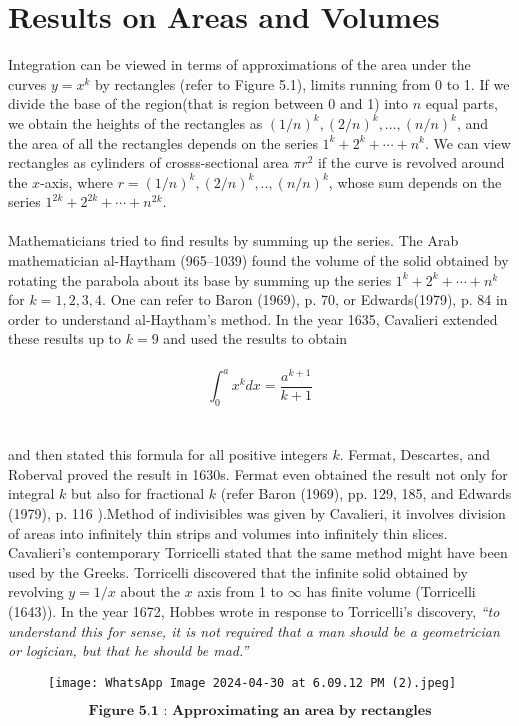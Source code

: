 \documentclass[a4paper,reqno,11pt]{book}
\theoremstyle{plain}%
\theoremstyle{definition}
\begin{document}
\section{Results on Areas and Volumes}
Integration can be viewed in terms of approximations of the area under the curves $y = x^k$ by rectangles (refer to Figure 5.1), limits running from 0 to 1. If we divide the base of the region(that is region between 0 and 1) into $n$ equal parts, we obtain the heights of the rectangles as $(1/n)^k,(2/n)^k,...,(n/n)^k$, and the area of all the rectangles depends on the series $1^k + 2^k + \cdots + n^k$. We can view rectangles as cylinders of crosss-sectional area $\pi r^2$ if the curve is revolved around the $x$-axis, where $r = (1/n)^k,(2/n)^k,..,(n/n)^k$, whose sum depends on the series $ 1^{2k} + 2^{2k} + \cdots + n^{2k}$.\\
\\
\indent Mathematicians tried to find results by summing up the series. The Arab mathematician al-Haytham (965–1039) found the volume of the solid obtained by rotating the parabola about its base by summing up the series $1^k + 2^k + \cdots + n^k$ for $k = 1, 2, 3, 4$. One can refer to Baron (1969), p. 70, or Edwards(1979), p. 84 in order to understand al-Haytham’s method. In the year 1635, Cavalieri extended these results up to $k = 9$ and used the results to obtain\\
\\
$$\int_{0}^{a} x^k dx = \frac{a^{k+1}}{k+1}$$
\\
\\
and then stated this formula for all positive integers $k$. Fermat, Descartes, and Roberval proved the result in 1630s. Fermat even obtained the result not only for integral $k$ but also for fractional $k$ (refer Baron (1969), pp. 129, 185, and Edwards (1979), p. 116 \cite{ref 2}).Method of indivisibles was given by Cavalieri, it involves division of areas into infinitely thin strips and volumes into infinitely thin slices. Cavalieri’s contemporary Torricelli stated that the same method might have been used by the Greeks. Torricelli discovered that the infinite solid obtained by revolving
$y = 1/x$ about the $x$ axis from 1 to $\infty$ has finite volume (Torricelli (1643)). In the year 1672, Hobbes wrote in response to Torricelli's discovery, \textit{“to understand this for sense, it is not required that a man should
be a geometrician or logician, but that he should be mad.”}
\begin{figure}
\texttt{[image: WhatsApp Image 2024-04-30 at 6.09.12 PM (2).jpeg]}
\centering
\end{figure}
$$\textbf{Figure 5.1 : Approximating an area by rectangles}$$
\end{document}

